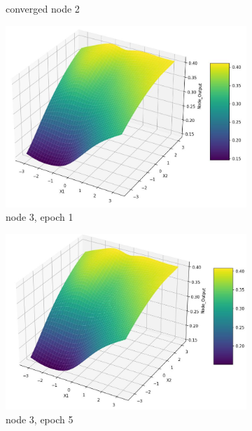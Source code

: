 \documentclass[11pt]{article}
\begin{document}
\begin{figure}[h!]
\begin{subfigure}[b]{0.45\textwidth}
	\caption{ converged node 2}
	\label{fig:fig2.1.3.10}
	\end{subfigure}
	\begin{subfigure}[b]{0.30\textwidth}
	\centering
	\includegraphics[scale=0.14]{output_n3_e1.jpg}
	\caption{node 3, epoch 1}
	\label{fig:fig2.1.3.11}
	\end{subfigure}
	\begin{subfigure}[b]{0.30\textwidth}
	\centering
	\includegraphics[scale=0.14]{output_n3_e5.jpg}
	\caption{ node 3, epoch 5}
	\label{fig:fig2.1.3.12}
	\end{subfigure}
	\begin{subfigure}[b]{0.30\textwidth}
	\centering

\end{subfigure}
\end{figure}
\end{document}
